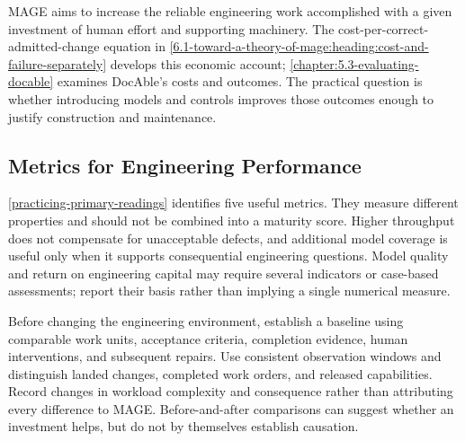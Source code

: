 
MAGE aims to increase the reliable engineering work accomplished with a given investment of human effort and supporting machinery. The cost-per-correct-admitted-change equation in \autoref{6.1-toward-a-theory-of-mage:heading:cost-and-failure-separately} develops this economic account; \autoref{chapter:5.3-evaluating-docable} examines DocAble's costs and outcomes. The practical question is whether introducing models and controls improves those outcomes enough to justify construction and maintenance.

\subsection{Metrics for Engineering Performance}\label{heading:metrics-for-engineering-performance}

\autoref{practicing-primary-readings} identifies five useful metrics. They measure different properties and should not be combined into a maturity score. Higher throughput does not compensate for unacceptable defects, and additional model coverage is useful only when it supports consequential engineering questions. Model quality and return on engineering capital may require several indicators or case-based assessments; report their basis rather than implying a single numerical measure.

Before changing the engineering environment, establish a baseline using comparable work units, acceptance criteria, completion evidence, human interventions, and subsequent repairs. Use consistent observation windows and distinguish landed changes, completed work orders, and released capabilities. Record changes in workload complexity and consequence rather than attributing every difference to MAGE. Before-and-after comparisons can suggest whether an investment helps, but do not by themselves establish causation.

